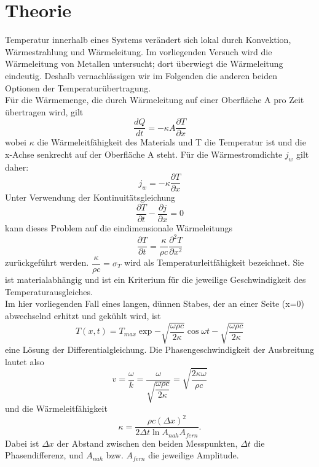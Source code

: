 \section{Theorie}
\label{sec:Theorie}

Temperatur innerhalb eines Systems verändert sich lokal durch Konvektion, Wärmestrahlung
und Wärmeleitung. Im vorliegenden Versuch wird die Wärmeleitung von Metallen untersucht;
dort überwiegt die Wärmeleitung eindeutig. Deshalb vernachlässigen wir im Folgenden die 
anderen beiden Optionen der Temperaturübertragung.\\
Für die Wärmemenge, die durch Wärmeleitung auf einer Oberfläche A pro Zeit übertragen 
wird, gilt
\begin{equation}
    \dfrac{dQ}{dt}=-\kappa A \dfrac{\partial T}{\partial x}
\end{equation}
wobei $\kappa$ die Wärmeleitfähigkeit des Materials und T die Temperatur ist und die x-Achse 
senkrecht auf der Oberfläche A steht. 
Für die Wärmestromdichte $j_w$ gilt 
daher:
\begin{equation}
    j_w=-\kappa \dfrac{\partial T}{\partial x}
\end{equation}
Unter Verwendung der Kontinuitätsgleichung
\begin{equation}
    \dfrac{\partial T}{\partial t}-\dfrac{\partial j}{\partial x}=0
\end{equation}
kann dieses Problem auf die eindimensionale Wärmeleitungs
\begin{equation}
    \dfrac{\partial T}{\partial t}=\dfrac{\kappa}{\rho c}\dfrac{\partial^2 T}{\partial x^2}
\end{equation}
zurückgeführt werden. $\dfrac{\kappa}{\rho c} = \sigma_T$ wird als Temperaturleitfähigkeit
bezeichnet. Sie ist materialabhängig und ist ein Kriterium für die jeweilige Geschwindigkeit 
des Temperaturausgleiches.\\
Im hier vorliegenden Fall eines langen, dünnen Stabes, der an einer Seite (x=0) abwechselnd 
erhitzt und gekühlt wird, ist 
\begin{equation}
    T(x,t)=T_{max} \exp{-\sqrt{\dfrac{\omega \rho c}{2 \kappa}}} \cos{\omega t - \sqrt{
        \dfrac{\omega \rho c}{2 \kappa}}}
\end{equation}
eine Lösung der Differentialgleichung. Die Phasengeschwindigkeit der Ausbreitung lautet also
\begin{equation}
    v = \dfrac{\omega}{k}=\dfrac{\omega}{\sqrt{\dfrac{\omega \rho c}{2 \kappa}}}
      = \sqrt{\dfrac{2 \kappa \omega}{\rho c}}
\end{equation}
und die Wärmeleitfähigkeit
\begin{equation}
    \kappa = \dfrac{\rho c (\Delta x)^2}{2 \Delta t \ln{A_{nah}}{A_{fern}}}.
\end{equation}
Dabei ist $\Delta x$ der Abstand zwischen den beiden Messpunkten, $\Delta t$ die Phasendifferenz,
und $A_{nah}$ bzw. $A_{fern}$ die jeweilige Amplitude.